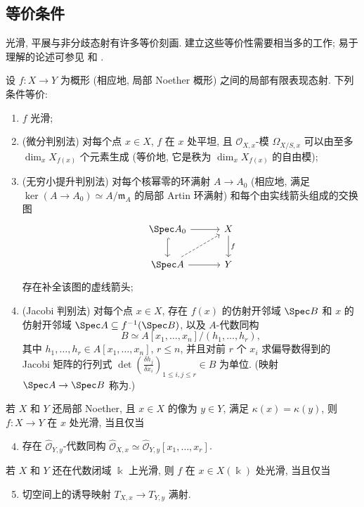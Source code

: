 \subsection{等价条件}\label{src:A.3.1-subsection}
光滑, 平展与非分歧态射有许多等价刻画. 建立这些等价性需要相当多的工作; 易于理解的论述可参见 \cite[第 $1$ 章]{Mil80} 和 \cite[\S$4.3$]{Liu02}.
\begin{theorem}[光滑性的等价条件]\label{src:A.3.1}
设 $f:X\to Y$ 为概形 (相应地, 局部 Noether 概形) 之间的局部有限表现态射. 下列条件等价:
\begin{enumerate}[(1)]
\item $f$ 光滑;
\item (微分判别法) 对每个点 $x\in X$, $f$ 在 $x$ 处平坦, 且 $\mathcal O_{X,x}$-模 $\Omega_{X/S,x}$ 可以由至多 $\dim_x X_{f(x)}$ 个元素生成 (等价地, 它是秩为 $\dim_x X_{f(x)}$ 的自由模);
\item (无穷小提升判别法) 对每个核幂零的环满射 $A\to A_0$ (相应地, 满足 $\ker(A\to A_0)\simeq A/\mathfrak m_A$ 的局部 Artin 环满射) 和每个由实线箭头组成的交换图
\[
\begin{tikzcd}[column sep=3em,row sep=2em]
\Spec A_0\arrow[r]\arrow[d,hook]&X\arrow[d,"f"]\\
\Spec A\arrow[r]\arrow[ur,dashed]&Y
\end{tikzcd}
\]
存在补全该图的虚线箭头;
\item (Jacobi 判别法) 对每个点 $x\in X$, 存在 $f(x)$ 的仿射开邻域 $\Spec B$ 和 $x$ 的仿射开邻域 $\Spec A\subseteq f^{-1}(\Spec B)$, 以及 $A$-代数同构
\[
B\simeq A[x_1,\ldots,x_n]/(h_1,\ldots,h_r),
\]
其中 $h_1,\ldots,h_r\in A[x_1,\ldots,x_n]$, $r\leq n$, 并且对前 $r$ 个 $x_i$ 求偏导数得到的 Jacobi 矩阵的行列式 $\det(\frac{\delta h_j}{\delta x_i})_{1\leq i,j\leq r}\in B$ 为单位. (映射 $\Spec A\to\Spec B$ 称为.)
\end{enumerate}
若 $X$ 和 $Y$ 还局部 Noether, 且 $x\in X$ 的像为 $y\in Y$, 满足 $\kappa(x)=\kappa(y)$, 则 $f:X\to Y$ 在 $x$ 处光滑, 当且仅当
\begin{enumerate}[(1)]\setcounter{enumi}{3}
\item 存在 $\widehat{\mathcal O}_{Y,y}$-代数同构 $\widehat{\mathcal O}_{X,x}\simeq\widehat{\mathcal O}_{Y,y}[x_1,\ldots,x_r]$.
\end{enumerate}
若 $X$ 和 $Y$ 还在代数闭域 $\Bbbk$ 上光滑, 则 $f$ 在 $x\in X(\Bbbk)$ 处光滑, 当且仅当
\begin{enumerate}[(1)]\setcounter{enumi}{4}
\item 切空间上的诱导映射 $T_{X,x}\to T_{Y,y}$ 满射.
\end{enumerate}
\end{theorem}
